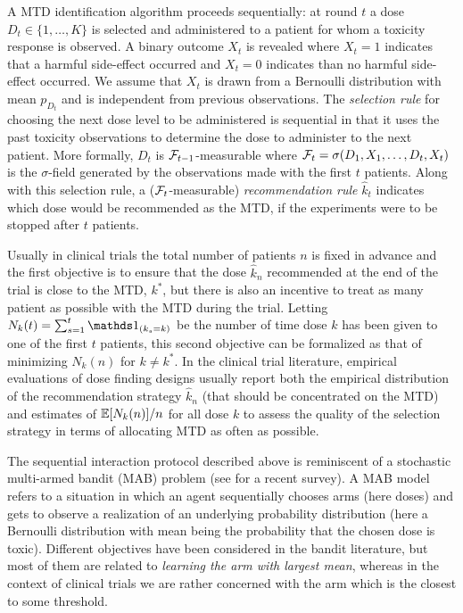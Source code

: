 A MTD identification algorithm proceeds sequentially: at round $t$ a dose $D_t \in \{1,\dots,K\}$ is selected and administered to a patient for whom a toxicity response is observed. A binary outcome $X_t$ is revealed where $X_t = 1$ indicates that a harmful side-effect occurred and $X_t=0$ indicates than no harmful side-effect occurred. We assume that $X_t$ is drawn from a Bernoulli distribution with mean $p_{D_t}$ and is independent from previous observations. The \emph{selection rule} for choosing the next dose level to be administered is sequential in that it uses the past toxicity observations to determine the dose to administer to the next patient. More formally, $D_t$ is $\mathcal{F}_{t-1}$-measurable where $\mathcal{F}_t= \sigma(D_1,X_1,\dots,D_t,X_t)$ is the $\sigma$-field generated by the observations made with the first $t$ patients. Along with this selection rule, a ($\mathcal{F}_{t}$-measurable) \emph{recommendation rule} $\hat{k}_t$ indicates which dose would be recommended as the MTD, if the experiments were to be stopped after $t$ patients. 

Usually in clinical trials the total number of patients $n$ is fixed in advance and the first objective is to ensure that the dose $\hat{k}_n$ recommended at the end of the trial is close to the MTD, $k^*$, but there is also an incentive to treat as many patient as possible with the MTD during the trial. Letting $N_k(t) = \sum_{s=1}^t\ind_{(k_s = k)}$ be the number of time dose $k$ has been given to one of the first $t$ patients, this second objective can be formalized as that of minimizing $N_k(n)$ for $k\neq k^*$.  In the clinical trial literature,  empirical evaluations of dose finding designs usually report both the empirical distribution of the recommendation strategy $\hat{k}_n$ (that should be concentrated on the MTD) and estimates of $\mathbb{E}[N_k(n)]/n$ for all dose $k$ to assess the quality of the selection strategy in terms of allocating MTD as often as possible. 


The sequential interaction protocol described above is reminiscent of a stochastic multi-armed bandit (MAB) problem (see \cite{BanditBook18} for a recent survey). A MAB model refers to a situation in which an agent sequentially chooses arms (here doses) and gets to observe a realization of an underlying probability distribution (here a Bernoulli distribution with mean being the probability that the chosen dose is toxic). Different objectives have been considered in the bandit literature, but most of them are related to \emph{learning the arm with largest mean}, whereas in the context of clinical trials we are rather concerned with the arm which is the closest to some threshold. 

